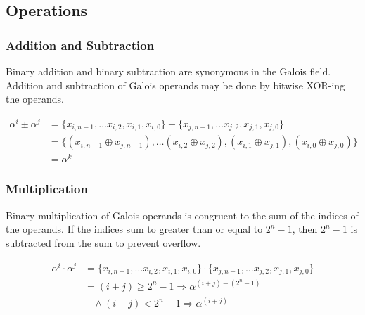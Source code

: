 \documentclass[11pt]{extarticle}
\begin{document}
            \newpage

        \subsection{Operations}

            \subsubsection{Addition and Subtraction} Binary addition and binary
            subtraction are synonymous in the Galois field. Addition and
            subtraction of Galois operands may be done by bitwise XOR-ing the
            operands.

                \begin{equation*}
                    \begin{split}
                        \alpha^{i} \pm \alpha^{j} & = \{x_{i, n-1},\ldots x_{i,
                        2},x_{i, 1},x_{i, 0}\} + \{x_{j, n-1}, \ldots x_{j, 2},
                        x_{j, 1}, x_{j, 0}\} \\ & = \{(x_{i, n-1} \oplus
                        x_{j,n-1}), \ldots (x_{i, 2}\oplus x_{j, 2}), (x_{i,
                        1}\oplus x_{j, 1}), (x_{i, 0}\oplus x_{j, 0})\} \\ & =
                        \alpha^{k}
                    \end{split}
                \end{equation*}

            \subsubsection{Multiplication} Binary multiplication of Galois
            operands is congruent to the sum of the indices of the operands. If
            the indices sum to greater than or equal to $2^{n}-1$, then
            $2^{n}-1$ is subtracted from the sum to prevent overflow.

                \begin{equation*}
                    \begin{split}
                        \alpha^{i} \cdot \alpha^{j} & = \{x_{i, n-1},\ldots
                        x_{i, 2},x_{i, 1},x_{i, 0}\} \cdot \{x_{j, n-1}, \ldots
                        x_{j, 2}, x_{j, 1}, x_{j, 0}\} \\ & = (i + j) \geq
                        2^{n}-1 \Longrightarrow \alpha^{(i + j) - (2^{n}-1)} \\
                        & \ \ \ \ \wedge (i + j) < 2^{n}-1 \Longrightarrow
                        \alpha^{(i + j)}
                    \end{split}
                \end{equation*}
\end{document}

